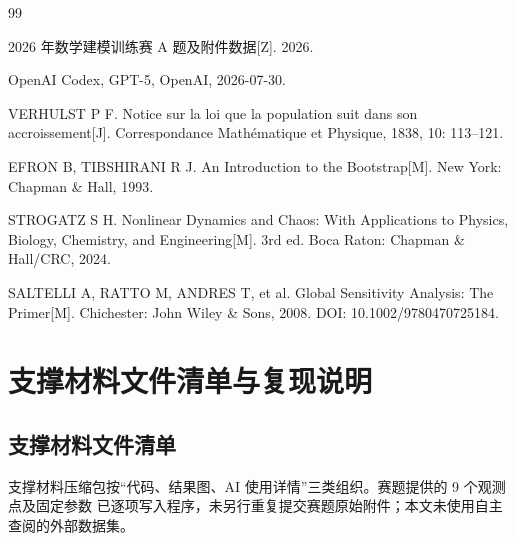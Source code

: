 \documentclass[12pt,a4paper]{ctexart}
\begin{document}
\newpage
\begin{thebibliography}{99}

 2026 年数学建模训练赛 A 题及附件数据[Z]. 2026.

 OpenAI Codex, GPT-5, OpenAI, 2026-07-30.

 VERHULST P F. Notice sur la loi que la population suit dans son accroissement[J]. Correspondance Math\'{e}matique et Physique, 1838, 10: 113--121.

 EFRON B, TIBSHIRANI R J. An Introduction to the Bootstrap[M]. New York: Chapman \& Hall, 1993.

 STROGATZ S H. Nonlinear Dynamics and Chaos: With Applications to Physics, Biology, Chemistry, and Engineering[M]. 3rd ed. Boca Raton: Chapman \& Hall/CRC, 2024.

 SALTELLI A, RATTO M, ANDRES T, et al. Global Sensitivity Analysis: The Primer[M]. Chichester: John Wiley \& Sons, 2008. DOI: 10.1002/9780470725184.

\end{thebibliography}

\clearpage
\appendix

\section{支撑材料文件清单与复现说明}

\subsection{支撑材料文件清单}

支撑材料压缩包按“代码、结果图、AI 使用详情”三类组织。赛题提供的 9 个观测点及固定参数
已逐项写入程序，未另行重复提交赛题原始附件；本文未使用自主查阅的外部数据集。
\end{document}
